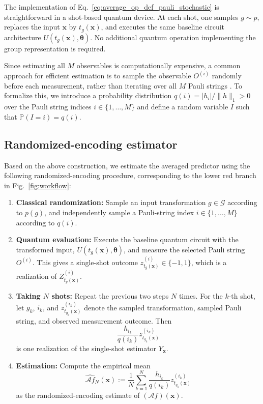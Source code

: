 \documentclass[%
 reprint,
 amsmath,amssymb,
 aps,
 pra,
]{revtex4-2}
\theoremstyle{definition}
\begin{document}
The implementation of Eq.~\eqref{eq:average_op_def_pauli_stochastic} is straightforward in a shot-based quantum device. At each shot, one samples \(g\sim p\), replaces the input \(\bm{x}\) by \(t_g(\bm{x})\), and executes the same baseline circuit architecture \(U(t_g(\bm{x}),\bm{\theta})\). No additional quantum operation implementing the group representation is required.

Since estimating all \(M\) observables is computationally expensive, a common approach for efficient estimation is to sample the observable \(O^{(i)}\) randomly before each measurement, rather than iterating over all \(M\) Pauli strings \cite{Sweke2020,Andrew2020,Moussa_2023}. To formalize this, we introduce a probability distribution \(q(i)= |h_i| / \|h\|_1 > 0\) over the Pauli string indices \(i \in \{1, \dots, M\}\) and define a random variable \(I\) such that \(\mathbb{P}(I=i) = q(i)\).

\subsection{Randomized-encoding estimator}

Based on the above construction, we estimate the averaged predictor using the following randomized-encoding procedure, corresponding to the lower red branch in Fig.~\ref{fig:workflow}:

\begin{enumerate}
    \item \textbf{Classical randomization:} Sample an input transformation \(g\in\mathcal{G}\) according to \(p(g)\), and independently sample a Pauli-string index \(i\in\{1,\dots,M\}\) according to \(q(i)\).
    \item \textbf{Quantum evaluation:} Execute the baseline quantum circuit with the transformed input, \(U(t_g(\bm{x}),\bm{\theta})\), and measure the selected Pauli string \(O^{(i)}\). This gives a single-shot outcome \(z_{t_g(\bm{x})}^{(i)}\in\{-1,1\}\), which is a realization of \(Z_{t_g(\bm{x})}^{(i)}\).
    \item \textbf{Taking \(N\) shots:} Repeat the previous two steps \(N\) times. For the \(k\)-th shot, let \(g_k\), \(i_k\), and \(z_{t_{g_k}(\bm{x})}^{(i_k)}\) denote the sampled transformation, sampled Pauli string, and observed measurement outcome. Then
    \begin{equation}
    \frac{h_{i_k}}{q(i_k)}z_{t_{g_k}(\bm{x})}^{(i_k)}
    \end{equation}
    is one realization of the single-shot estimator \(Y_{\bm{x}}\).
    \item \textbf{Estimation:} Compute the empirical mean
    \begin{equation}
    \widehat{\mathcal{A}f}_N(\bm{x})
    :=
    \frac{1}{N}
    \sum_{k=1}^N
    \frac{h_{i_k}}{q(i_k)}
    z_{t_{g_k}(\bm{x})}^{(i_k)}
    \end{equation}
    as the randomized-encoding estimate of \((\mathcal{A}f)(\bm{x})\).
\end{enumerate}
\end{document}
